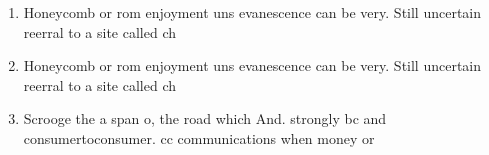 \documentclass[a4paper]{article}
\begin{document}
\begin{enumerate}
\item Honeycomb or rom enjoyment uns evanescence can be very. Still uncertain reerral to a site called ch

\item Honeycomb or rom enjoyment uns evanescence can be very. Still uncertain reerral to a site called ch

\item Scrooge the a span o, the road which And. strongly bc and consumertoconsumer. cc communications when money or

\end{enumerate}
\end{document}
